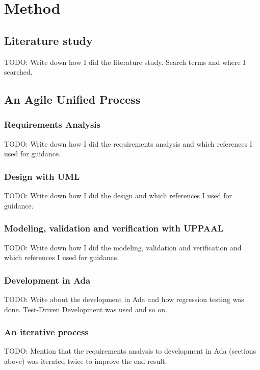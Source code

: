 \chapter{Method}\label{ch:method}
\section{Literature study}
TODO: Write down how I did the literature study. Search terms and where I
searched.

\section{An Agile Unified Process}
\subsection{Requirements Analysis}
TODO: Write down how I did the requirements analysis and which references I
used for guidance.

\subsection{Design with UML}
TODO: Write down how I did the design and which references I used for guidance.

\subsection{Modeling, validation and verification with UPPAAL}
TODO: Write down how I did the modeling, validation and verification and which
references I used for guidance.

\subsection{Development in Ada}
TODO: Write about the development in Ada and how regression testing was done.
Test-Driven Development was used and so on.

\subsection{An iterative process}
TODO: Mention that the requirements analysis to development in Ada (sections
above) was iterated twice to improve the end result.
